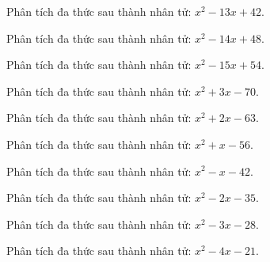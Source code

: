 \begin{bt}
	Phân tích đa thức sau thành nhân tử: $x^2 - 13 x + 42$.
\end{bt}
\begin{bt}
	Phân tích đa thức sau thành nhân tử: $x^2 - 14 x + 48$.
\end{bt}
\begin{bt}
	Phân tích đa thức sau thành nhân tử: $x^2 - 15 x + 54$.
\end{bt}
\begin{bt}
	Phân tích đa thức sau thành nhân tử: $x^2 + 3 x - 70$.
\end{bt}
\begin{bt}
	Phân tích đa thức sau thành nhân tử: $x^2 + 2 x - 63$.
\end{bt}
\begin{bt}
	Phân tích đa thức sau thành nhân tử: $x^2 + x - 56$.
\end{bt}
\begin{bt}
	Phân tích đa thức sau thành nhân tử: $x^2 - x - 42$.
\end{bt}
\begin{bt}
	Phân tích đa thức sau thành nhân tử: $x^2 - 2 x - 35$.
\end{bt}
\begin{bt}
	Phân tích đa thức sau thành nhân tử: $x^2 - 3 x - 28$.
\end{bt}
\begin{bt}
	Phân tích đa thức sau thành nhân tử: $x^2 - 4 x - 21$.
\end{bt}
